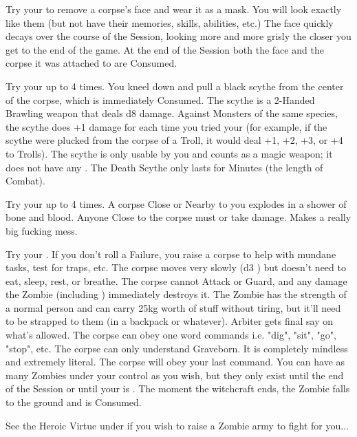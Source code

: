 \newpage


\NECRO[
  Name=Death Mask,
  Link=witchcraft-death-mask
]

Try your \JUJU to remove a corpse's face and wear it as a mask.  You will look exactly like them (but not have their memories, skills, abilities, etc.)  The face quickly decays over the course of the Session, looking more and more grisly the closer you get to the end of the game. At the end of the Session both the face and the corpse it was attached to are Consumed.

\NECRO[
  Name=Death Scythe,
  Link=witchcraft-death-scythe
]

Try your \JUJU up to 4 times. You kneel down and pull a black scythe from the center of the corpse, which is immediately Consumed. The scythe is a 2-Handed Brawling \FOC weapon that deals d8 damage. Against Monsters of the same species, the scythe does +1 damage for each time you tried your \JUJU (for example, if the scythe were plucked from the corpse of a Troll, it would deal +1, +2, +3, or +4 to Trolls). The scythe is only usable by you and counts as a magic weapon; it does not have any . The Death Scythe only lasts for Minutes (the length of Combat).

\NECRO[
  Name=Exploding Corpse,
  Link=witchcraft-exploding-corpse
]

Try your \JUJU up to 4 times. A corpse Close or Nearby to you explodes in a shower of bone and blood.  Anyone Close to the corpse must  or take \SUMDICE damage.  Makes a really big fucking mess.




\NECRO[
  Name=Zombie,
  Link=witchcraft-zombie
]

Try your \JUJU. If you don't roll a Failure, you raise a corpse to help with mundane tasks, test for traps, etc.  The corpse moves very slowly (d3 \MD) but doesn't need to eat, sleep, rest, or breathe. The corpse cannot Attack or Guard, and any damage the Zombie (including ) immediately destroys it. The Zombie has the strength of a normal person and can carry 25kg worth of stuff without tiring, but it'll need to be strapped to them (in a backpack or whatever). Arbiter gets final say on what's allowed. The corpse can obey one word commands i.e. "dig", "sit", "go", "stop", etc.  The corpse can only understand Graveborn. It is completely mindless and extremely literal. The corpse will obey your last command. You can have as many Zombies under your control as you wish, but they only exist until the end of the Session or until your \JUJU is . The moment the witchcraft ends, the Zombie falls to the ground and is Consumed.

See the Heroic Virtue  under  if you wish to raise a Zombie army to fight for you...
